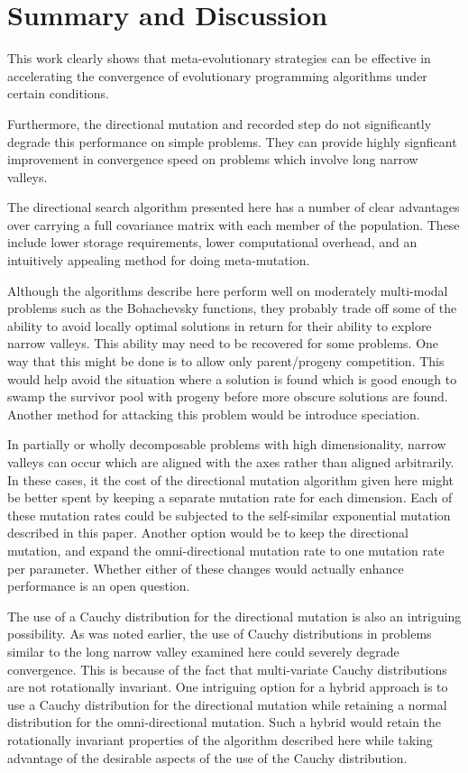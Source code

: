 \documentclass[12pt, titlepage]{article}
\begin{document}
\section{Summary and Discussion}

This work clearly shows that meta-evolutionary strategies can be
effective in accelerating the convergence of evolutionary programming
algorithms under certain conditions.

Furthermore, the directional mutation and recorded step do not
significantly degrade this performance on simple problems.  They can
provide highly signficant improvement in convergence speed on problems
which involve long narrow valleys.

The directional search algorithm presented here has a number of clear
advantages over carrying a full covariance matrix with each member of
the population.  These include lower storage requirements, lower
computational overhead, and an intuitively appealing method for doing
meta-mutation.

Although the algorithms describe here perform well on moderately
multi-modal problems such as the Bohachevsky functions, they probably
trade off some of the ability to avoid locally optimal solutions in
return for their ability to explore narrow valleys.  This ability may
need to be recovered for some problems.  One way that this might be
done is to allow only parent/progeny competition.  This would help
avoid the situation where a solution is found which is good enough to
swamp the survivor pool with progeny before more obscure solutions are
found.  Another method for attacking this problem would be introduce
speciation.

In partially or wholly decomposable problems with high dimensionality,
narrow valleys can occur which are aligned with the axes rather than
aligned arbitrarily.  In these cases, it the cost of the directional
mutation algorithm given here might be better spent by keeping a
separate mutation rate for each dimension.  Each of these mutation
rates could be subjected to the self-similar exponential mutation
described in this paper.  Another option would be to keep the
directional mutation, and expand the omni-directional mutation rate to
one mutation rate per parameter.  Whether either of these changes
would actually enhance performance is an open question.

The use of a Cauchy distribution for the directional mutation is also
an intriguing possibility.  As was noted earlier, the use of Cauchy
distributions in problems similar to the long narrow valley examined
here could severely degrade convergence.  This is because of the fact
that multi-variate Cauchy distributions are not rotationally
invariant.  One intriguing option for a hybrid approach is to use a
Cauchy distribution for the directional mutation while retaining a
normal distribution for the omni-directional mutation.  Such a hybrid
would retain the rotationally invariant properties of the algorithm
described here while taking advantage of the desirable aspects of the
use of the Cauchy distribution.
\end{document}

